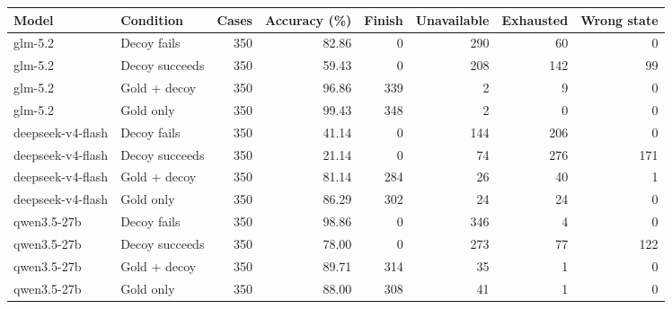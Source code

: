 \begin{tabular}{llrrrrrr}
\toprule
Model & Condition & Cases & Accuracy (\%) & Finish & Unavailable & Exhausted & Wrong state \\
\midrule
glm-5.2 & Decoy fails & 350 & 82.86 & 0 & 290 & 60 & 0 \\
glm-5.2 & Decoy succeeds & 350 & 59.43 & 0 & 208 & 142 & 99 \\
glm-5.2 & Gold + decoy & 350 & 96.86 & 339 & 2 & 9 & 0 \\
glm-5.2 & Gold only & 350 & 99.43 & 348 & 2 & 0 & 0 \\
deepseek-v4-flash & Decoy fails & 350 & 41.14 & 0 & 144 & 206 & 0 \\
deepseek-v4-flash & Decoy succeeds & 350 & 21.14 & 0 & 74 & 276 & 171 \\
deepseek-v4-flash & Gold + decoy & 350 & 81.14 & 284 & 26 & 40 & 1 \\
deepseek-v4-flash & Gold only & 350 & 86.29 & 302 & 24 & 24 & 0 \\
qwen3.5-27b & Decoy fails & 350 & 98.86 & 0 & 346 & 4 & 0 \\
qwen3.5-27b & Decoy succeeds & 350 & 78.00 & 0 & 273 & 77 & 122 \\
qwen3.5-27b & Gold + decoy & 350 & 89.71 & 314 & 35 & 1 & 0 \\
qwen3.5-27b & Gold only & 350 & 88.00 & 308 & 41 & 1 & 0 \\
\bottomrule
\end{tabular}
